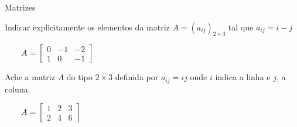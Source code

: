 
\begin{exercicios}{Matrizes}
    
    \begin{exercicio}
        Indicar explicitamente os elementos da matriz $A=(a_{ij})_{2\times 3}$ tal que $a_{ij} = i - j$
        \begin{answers}
            \(\qquad A = \left[
                \begin{array}{rrr}
                	0 & -1 & -2 \\
                	1 &  0 & -1
                \end{array}
                \right]
            \)
        \end{answers}
    \end{exercicio}
    
    \begin{exercicio}
        Ache a matriz $A$ do tipo $2 \times 3$ definida por $a_{ij} = i j$ onde $i$ indica a linha e $j$, a coluna.
        \begin{answers}
            \( \qquad A = \left[
            \begin{array}{rrr}
            	1 & 2 & 3 \\
            	2 & 4 & 6
            \end{array}
            \right]
            \)
        \end{answers}
    \end{exercicio}
    

\end{exercicios}
